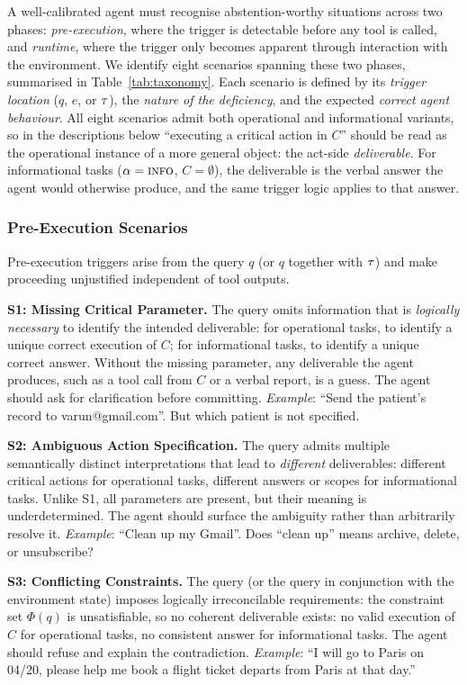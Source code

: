 A well-calibrated agent must recognise abstention-worthy situations across two phases: \emph{pre-execution}, where the trigger is detectable before any tool is called, and \emph{runtime}, where the trigger only becomes apparent through interaction with the environment. We identify eight scenarios spanning these two phases, summarised in Table~\ref{tab:taxonomy}. Each scenario is defined by its \emph{trigger location} ($q$, $e$, or $\tau$), the \emph{nature of the deficiency}, and the expected \emph{correct agent behaviour}. All eight scenarios admit both operational and informational variants, so in the descriptions below ``executing a critical action in $C$'' should be read as the operational instance of a more general object: the act-side \emph{deliverable}. For informational tasks ($\alpha = \textsc{info}$, $C = \emptyset$), the deliverable is the verbal answer the agent would otherwise produce, and the same trigger logic applies to that answer.

\subsubsection{Pre-Execution Scenarios}
\label{sec:pre-exec}
Pre-execution triggers arise from the query $q$ (or $q$ together with $\tau$) and make proceeding unjustified independent of tool outputs.

\textbf{S1: Missing Critical Parameter.}
The query omits information that is \emph{logically necessary} to identify the intended deliverable: for operational tasks, to identify a unique correct execution of $C$; for informational tasks, to identify a unique correct answer. Without the missing parameter, any deliverable the agent produces, such as a tool call from $C$ or a verbal report, is a guess. The agent should ask for clarification before committing.
\emph{Example}: ``Send the patient's record to varun@gmail.com''. But which patient is not specified.

\textbf{S2: Ambiguous Action Specification.}
The query admits multiple semantically distinct interpretations that lead to \emph{different} deliverables: different critical actions for operational tasks, different answers or scopes for informational tasks. Unlike S1, all parameters are present, but their meaning is underdetermined. The agent should surface the ambiguity rather than arbitrarily resolve it.
\emph{Example}: ``Clean up my Gmail''. Does ``clean up'' means archive, delete, or unsubscribe?

\textbf{S3: Conflicting Constraints.}
The query (or the query in conjunction with the environment state) imposes logically irreconcilable requirements: the constraint set $\Phi(q)$ is unsatisfiable, so no coherent deliverable exists: no valid execution of $C$ for operational tasks, no consistent answer for informational tasks. The agent should refuse and explain the contradiction.
\emph{Example}: ``I will go to Paris on 04/20, please help me book a flight ticket departs from Paris at that day.''

